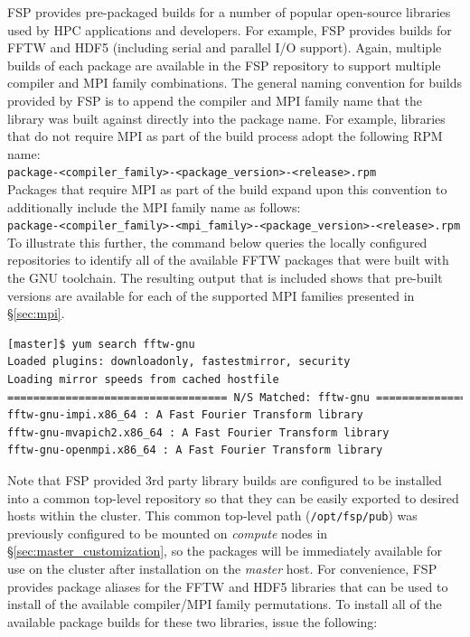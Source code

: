 \documentclass[letterpaper]{article}
\begin{document}
FSP provides pre-packaged builds for a number of popular open-source libraries
used by HPC applications and developers. For example, FSP provides builds for
FFTW and HDF5 (including serial and parallel I/O support). Again, multiple
builds of each package are available in the FSP repository to support multiple
compiler and MPI family combinations. The general naming convention for builds
provided by FSP is to append the compiler and MPI family name that the library
was built against directly into the package name. For example, libraries that
do not require MPI as part of the build process adopt the following RPM
name: \\

\noindent
\texttt{package-<compiler\_family>-<package\_version>-<release>.rpm} \\

\noindent Packages that require MPI as part of the build expand upon this convention to
additionally include the MPI family name as follows: \\

\noindent
\texttt{package-<compiler\_family>-<mpi\_family>-<package\_version>-<release>.rpm} \\

To illustrate this further, the command below queries the locally configured
repositories to identify all of the available FFTW packages that were built
with the GNU toolchain. The resulting output that is included shows that
pre-built versions are available for each of the supported MPI families
presented in \S\ref{sec:mpi}.

\begin{lstlisting}[language=bash]
[master]$ yum search fftw-gnu
Loaded plugins: downloadonly, fastestmirror, security
Loading mirror speeds from cached hostfile
================================== N/S Matched: fftw-gnu ==================================
fftw-gnu-impi.x86_64 : A Fast Fourier Transform library
fftw-gnu-mvapich2.x86_64 : A Fast Fourier Transform library
fftw-gnu-openmpi.x86_64 : A Fast Fourier Transform library
\end{lstlisting}

Note that FSP provided 3rd party library builds are configured to be installed
into a common top-level repository so that they can be easily exported to
desired hosts within the cluster. This common top-level path (\texttt{/opt/fsp/pub})
was previously configured to be mounted on {\em compute} nodes in
\S\ref{sec:master_customization}, so the packages will be immediately available
for use on the cluster after installation on the {\em master} host.  For
convenience, FSP provides package aliases for the FFTW and HDF5 libraries that
can be used to install of the available compiler/MPI family permutations. To
install all of the available package builds for these two libraries, issue the
following:
\end{document}
